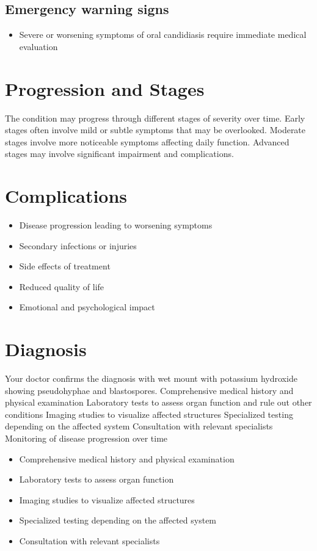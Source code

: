 \subsection{Emergency warning signs}
\begin{itemize}[noitemsep]
  \item Severe or worsening symptoms of oral candidiasis require immediate medical evaluation
\end{itemize}
\section{Progression and Stages}
The condition may progress through different stages of severity over time. Early stages often involve mild or subtle symptoms that may be overlooked. Moderate stages involve more noticeable symptoms affecting daily function. Advanced stages may involve significant impairment and complications.
\section{Complications}
\begin{itemize}[noitemsep]
  \item Disease progression leading to worsening symptoms
  \item Secondary infections or injuries
  \item Side effects of treatment
  \item Reduced quality of life
  \item Emotional and psychological impact
\end{itemize}
\section{Diagnosis}
Your doctor confirms the diagnosis with wet mount with potassium hydroxide showing pseudohyphae and blastospores. Comprehensive medical history and physical examination Laboratory tests to assess organ function and rule out other conditions Imaging studies to visualize affected structures Specialized testing depending on the affected system Consultation with relevant specialists Monitoring of disease progression over time

\begin{itemize}[noitemsep]
  \item Comprehensive medical history and physical examination
  \item Laboratory tests to assess organ function
  \item Imaging studies to visualize affected structures
  \item Specialized testing depending on the affected system
  \item Consultation with relevant specialists
\end{itemize}
